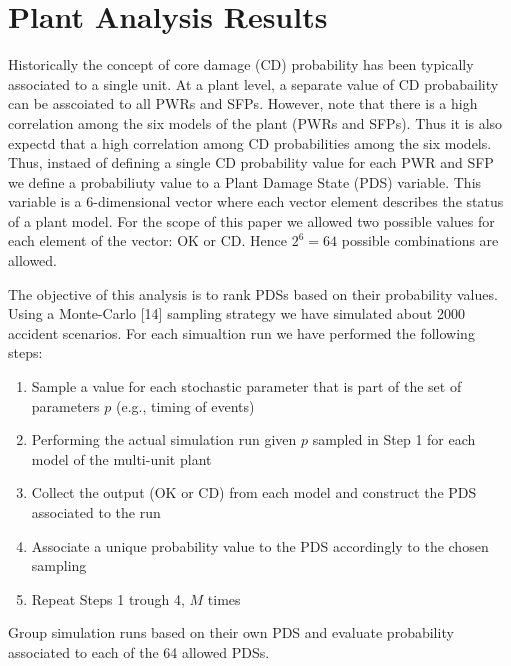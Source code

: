 \section{Plant Analysis Results}
\label{sec:plantAnalysisResults}

Historically the concept of core damage (CD) probability has been typically associated to a single unit. 
At a plant level, a separate value of CD probabaility can be asscoiated to all PWRs and SFPs. 
However, note that there is a high correlation among the six models of the plant (PWRs and SFPs). 
Thus it is also expectd that a high correlation among CD probabilities among the six models.
Thus, instaed of defining a single CD probability value for each PWR and SFP we define a probabiliuty 
value to a Plant Damage State (PDS) variable. This variable is a $6$-dimensional vector where each vector 
element describes the status of a plant model. For the scope of this paper we allowed two possible values 
for each element of the vector: OK or CD. Hence $2^6=64$ possible combinations are allowed.

The objective of this analysis is to rank PDSs based on their probability values.
Using a Monte-Carlo [14] sampling strategy we have simulated about 2000 accident scenarios. 
For each simualtion run we have performed the following steps:
\begin{enumerate}
  \item Sample a value for each stochastic parameter that is part of the set of parameters $p$ (e.g., timing of events)
  \item Performing the actual simulation run given $p$ sampled in Step 1 for each model of the multi-unit plant
  \item Collect the output (OK or CD) from each model and construct the PDS associated to the run
  \item Associate a unique probability value to the PDS accordingly to the chosen sampling
  \item Repeat Steps 1 trough 4, $M$ times 
\end{enumerate}
Group simulation runs based on their own PDS and evaluate probability associated to each of the 64 allowed PDSs.
